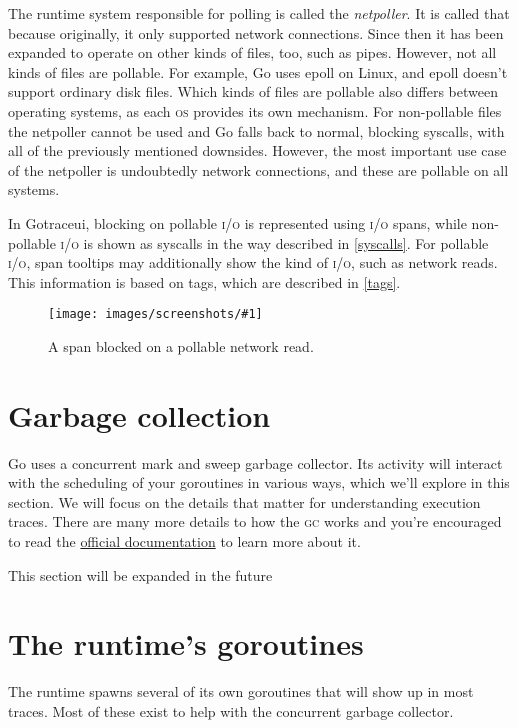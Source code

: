 \documentclass[10pt,letterpaper,oneside,openany,english]{memoir}
\newcommand{\todo}[1]{{\color{red}#1}}
\newcommand{\screenshot}[2]{%
\begin{figure}[!ht]
  \centering
  \texttt{[image: images/screenshots/\#1]}
  \caption{#2}
\end{figure}}
\begin{document}
The runtime system responsible for polling is called the \emph{netpoller}. It is called that because originally, it only supported network connections.
Since then it has been expanded to operate on other kinds of files, too, such as pipes.
However, not all kinds of files are pollable. For example, Go uses epoll on Linux, and epoll doesn't support ordinary disk files.
Which kinds of files are pollable also differs between operating systems, as each \textsc{os} provides its own mechanism.
For non-pollable files the netpoller cannot be used and Go falls back to normal, blocking syscalls, with all of the previously mentioned downsides.
However, the most important use case of the netpoller is undoubtedly network connections, and these are pollable on all systems.

In Gotraceui, blocking on pollable \textsc{i/o} is represented using \textsc{i/o} spans, while non-pollable \textsc{i/o} is shown as syscalls in the way described in \cref{syscalls}.
For pollable \textsc{i/o}, span tooltips may additionally show the kind of \textsc{i/o}, such as network reads. This information is based on tags, which are described in \cref{tags}.

\screenshot{pollable-io-span.png}{A span blocked on a pollable network read.}

\section{Garbage collection}\label{gc}
Go uses a concurrent mark and sweep garbage collector.
Its activity will interact with the scheduling of your goroutines in various ways,
which we'll explore in this section.
We will focus on the details that matter for understanding execution traces.
There are many more details to how the \textsc{gc} works
and you're encouraged to read the \href{https://go.dev/doc/gc-guide}{official documentation}\cite{GuideGoGarbage} to learn more about it.


\todo{This section will be expanded in the future}

\section{The runtime's goroutines}
The runtime spawns several of its own goroutines that will show up in most traces.
Most of these exist to help with the concurrent garbage collector.
\end{document}
